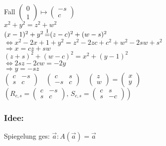 Fall $\begin{pmatrix} 0 \\ 1 \end{pmatrix} \mapsto \begin{pmatrix} -s \\ c \end{pmatrix}$\\
$x^{2}+y^{2} = z^{2} + w^{2}$\\
$(x-1)^{2} + y^{2} \mathop{=}\limits^{\text{\RM{1}}} ( z-c)^{2} + (w-s)^{2}$\\
$\Leftrightarrow x^{2}-2x+1+y^{2} = z^{2}-2zc+c^{2}+w^{2}-2sw+s^{2}$\\
$\Rightarrow x= cz + sw$\\
$(z+s)^{2} + (w-c)^{2} = x^{2}+(y-1)^{2}$\\
$\Leftrightarrow 2sz-2cw = -2y$\\
$\Rightarrow y = -sz$\\
$\begin{pmatrix} c & -s \\ s & c \end{pmatrix} \quad \begin{pmatrix} c & s \\ -s & c \end{pmatrix} \quad \begin{pmatrix} z \\ w \end{pmatrix} = \begin{pmatrix} x \\ y \end{pmatrix}$ \\
$(R_{c,s} = \begin{pmatrix} c & -s \\ s & c \end{pmatrix}, \, S_{c,s} = \begin{pmatrix} c & s \\ s & -c \end{pmatrix})$\\
%
%
%
\subsubsection{Idee:}
Spiegelung ges: $\vec{a}: A(\vec{a})=\vec{a}$
%
%
%
